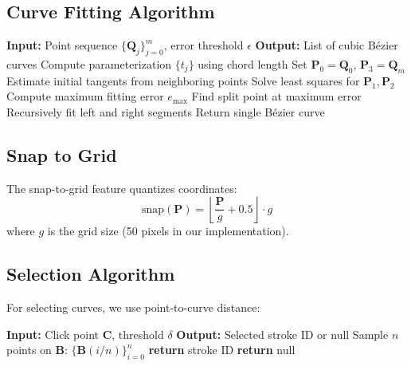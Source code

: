 \documentclass[12pt,a4paper]{article}
\begin{document}
\subsection{Curve Fitting Algorithm}

\begin{algorithm}
\caption{Bézier Curve Fitting}
\begin{algorithmic}[1]
\STATE \textbf{Input:} Point sequence $\{\mathbf{Q}_j\}_{j=0}^{m}$, error threshold $\epsilon$
\STATE \textbf{Output:} List of cubic Bézier curves
\STATE Compute parameterization $\{t_j\}$ using chord length
\STATE Set $\mathbf{P}_0 = \mathbf{Q}_0$, $\mathbf{P}_3 = \mathbf{Q}_m$
\STATE Estimate initial tangents from neighboring points
\STATE Solve least squares for $\mathbf{P}_1, \mathbf{P}_2$
\STATE Compute maximum fitting error $e_{\max}$
    \STATE Find split point at maximum error
    \STATE Recursively fit left and right segments
\ELSE
    \STATE Return single Bézier curve
\ENDIF
\end{algorithmic}
\end{algorithm}

\subsection{Snap to Grid}

The snap-to-grid feature quantizes coordinates:
\begin{equation}
\text{snap}(\mathbf{P}) = \left\lfloor \frac{\mathbf{P}}{g} + 0.5 \right\rfloor \cdot g
\end{equation}
where $g$ is the grid size (50 pixels in our implementation).

\subsection{Selection Algorithm}

For selecting curves, we use point-to-curve distance:

\begin{algorithm}
\caption{Curve Selection}
\begin{algorithmic}[1]
\STATE \textbf{Input:} Click point $\mathbf{C}$, threshold $\delta$
\STATE \textbf{Output:} Selected stroke ID or null
        \STATE Sample $n$ points on $\mathbf{B}$: $\{\mathbf{B}(i/n)\}_{i=0}^{n}$
                \STATE \textbf{return} stroke ID
            \ENDIF
        \ENDFOR
    \ENDFOR
\ENDFOR
\STATE \textbf{return} null
\end{algorithmic}
\end{algorithm}
\end{document}
